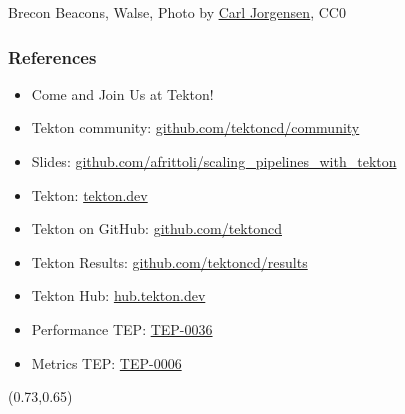 \documentclass[aspectratio=169,11pt,hyperref={colorlinks=true}]{beamer}
\begin{document}
\begin{sectionwithpiclargecentral}{Brecon Beacons, Walse, Photo by \href{https://unsplash.com/@scamartist}{\underline{Carl Jorgensen}}, CC0}
\end{sectionwithpiclargecentral}

\begin{blackframe}
  \frametitle{References}
  \begin{itemize}
    \item \large Come and Join Us at Tekton!
    \item \normalsize Tekton community: \href{https://github.com/tektoncd/community}{github.com/tektoncd/community} \\
  \end{itemize}
  \begin{itemize}
    \item Slides: \href{https://github.com/afrittoli/scaling_pipelines_with_tekton/blob/scd2021/scaling_pipelines_with_tekton.pdf}{github.com/afrittoli/scaling\_pipelines\_with\_tekton}
    \item Tekton: \href{https://tekton.dev}{tekton.dev}
    \item Tekton on GitHub: \href{https://github.com/tektoncd}{github.com/tektoncd}
    \item Tekton Results: \href{https://github.com/tektoncd/results}{github.com/tektoncd/results}
    \item Tekton Hub: \href{https://hub.tekton.dev}{hub.tekton.dev}
    \item Performance TEP: \href{https://github.com/tektoncd/community/blob/master/teps/0036-start-measuring-tekton-pipelines-performance.md}{TEP-0036}
    \item Metrics TEP: \href{https://github.com/tektoncd/community/blob/master/teps/0006-tekton-metrics.md}{TEP-0006}
  \end{itemize}
  \begin{textblock*}{0.13\paperwidth}(0.73\paperwidth,0.65\paperheight)
    
  \end{textblock*}
\end{blackframe}
\end{document}
